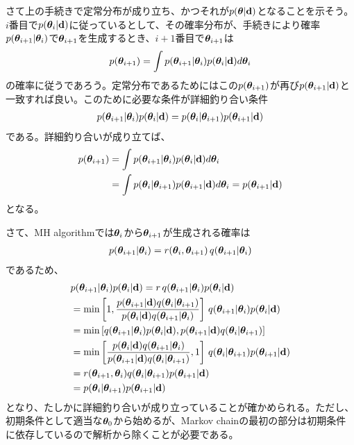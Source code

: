さて上の手続きで定常分布が成り立ち、かつそれが$p({\boldsymbol{\theta}}|{\bf d})$となることを示そう。$i$番目で$p({\boldsymbol{\theta}}_i|{\bf d})$に従っているとして、その確率分布が、手続きにより確率$p({\boldsymbol{\theta}}_{i+1}|{\boldsymbol{\theta}}_{i})$で${\boldsymbol{\theta}}_{i+1}$を生成するとき、$i+1$番目で${\boldsymbol{\theta}}_{i+1}$は
\begin{align}
p({\boldsymbol{\theta}}_{i+1}) = \int p({\boldsymbol{\theta}}_{i+1}|{\boldsymbol{\theta}}_{i}) p({\boldsymbol{\theta}}_i|{\bf d}) d {\boldsymbol{\theta}}_i
\end{align}
の確率に従うであろう。定常分布であるためにはこの$p({\boldsymbol{\theta}}_{i+1})$が再び$p({\boldsymbol{\theta}}_{i+1}|{\bf d})$と一致すれば良い。このために必要な条件が詳細釣り合い条件
\begin{align}
 p({\boldsymbol{\theta}}_{i+1}|{\boldsymbol{\theta}}_{i}) p({\boldsymbol{\theta}}_i|{\bf d}) = p({\boldsymbol{\theta}}_{i}|{\boldsymbol{\theta}}_{i+1}) p({\boldsymbol{\theta}}_{i+1}|{\bf d}) 
\end{align}
である。詳細釣り合いが成り立てば、
\begin{align}
  p({\boldsymbol{\theta}}_{i+1}) &= \int p({\boldsymbol{\theta}}_{i+1}|{\boldsymbol{\theta}}_{i}) p({\boldsymbol{\theta}}_i|{\bf d}) d {\boldsymbol{\theta}}_i \nonumber \\
  &= \int p({\boldsymbol{\theta}}_{i}|{\boldsymbol{\theta}}_{i+1}) p({\boldsymbol{\theta}}_{i+1}|{\bf d}) d {\boldsymbol{\theta}}_i = p({\boldsymbol{\theta}}_{i+1}|{\bf d})
\end{align}
となる。

さて、MH algorithmでは${\boldsymbol{\theta}}_i$から${\boldsymbol{\theta}}_{i+1}$が生成される確率は
\begin{align}
p({\boldsymbol{\theta}}_{i+1}|{\boldsymbol{\theta}}_{i}) = r({\boldsymbol{\theta}}_i,{\boldsymbol{\theta}}_{i+1}) \, q({\boldsymbol{\theta}}_{i+1}|{\boldsymbol{\theta}}_i)
\end{align}
であるため、
\begin{align}
  &p({\boldsymbol{\theta}}_{i+1}|{\boldsymbol{\theta}}_{i}) p({\boldsymbol{\theta}}_i|{\bf d}) = r \, q({\boldsymbol{\theta}}_{i+1}|{\boldsymbol{\theta}}_i) p({\boldsymbol{\theta}}_i|{\bf d}) \nonumber \\
  &= \mathrm{min} \left[1, \frac{p({\boldsymbol{\theta}}_{i+1}|{\bf d}) q({\boldsymbol{\theta}}_i|{\boldsymbol{\theta}}_{i+1})}{p({\boldsymbol{\theta}}_i|{\bf d}) q({\boldsymbol{\theta}}_{i+1}|{\boldsymbol{\theta}}_i)} \right] \, q({\boldsymbol{\theta}}_{i+1}|{\boldsymbol{\theta}}_i) p({\boldsymbol{\theta}}_i|{\bf d}) \nonumber \\
  &= \mathrm{min} \left[q({\boldsymbol{\theta}}_{i+1}|{\boldsymbol{\theta}}_i) p({\boldsymbol{\theta}}_i|{\bf d}) , p({\boldsymbol{\theta}}_{i+1}|{\bf d}) q({\boldsymbol{\theta}}_i|{\boldsymbol{\theta}}_{i+1}) \right] \, \nonumber \\
  &= \mathrm{min} \left[\frac{ p({\boldsymbol{\theta}}_i|{\bf d}) q({\boldsymbol{\theta}}_{i+1}|{\boldsymbol{\theta}}_i)}{p({\boldsymbol{\theta}}_{i+1}|{\bf d}) q({\boldsymbol{\theta}}_i|{\boldsymbol{\theta}}_{i+1})} , 1 \right] \, q({\boldsymbol{\theta}}_i|{\boldsymbol{\theta}}_{i+1}) p({\boldsymbol{\theta}}_{i+1}|{\bf d}) \nonumber \\
  &=  r({\boldsymbol{\theta}}_{i+1},{\boldsymbol{\theta}}_i)  q({\boldsymbol{\theta}}_i|{\boldsymbol{\theta}}_{i+1}) p({\boldsymbol{\theta}}_{i+1}|{\bf d}) \nonumber \\
  &= p({\boldsymbol{\theta}}_i|{\boldsymbol{\theta}}_{i+1}) p({\boldsymbol{\theta}}_{i+1}|{\bf d})
\end{align}
となり、たしかに詳細釣り合いが成り立っていることが確かめられる。ただし、初期条件として適当な${\boldsymbol{\theta}}_0$から始めるが、Markov chainの最初の部分は初期条件に依存しているので解析から除くことが必要である。

